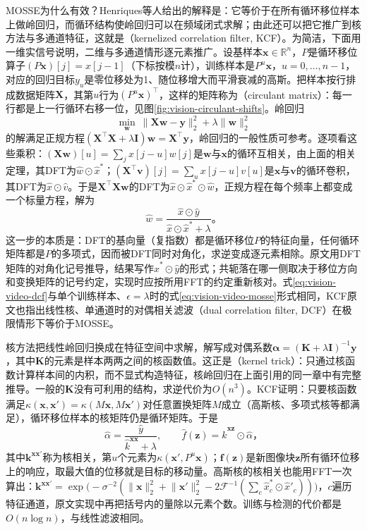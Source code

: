 MOSSE为什么有效？Henriques等人给出的解释是：它等价于在所有循环移位样本上做岭回归，而循环结构使岭回归可以在频域闭式求解；由此还可以把它推广到核方法与多通道特征，这就是（kernelized correlation filter, KCF）。为简洁，下面用一维实信号说明，二维与多通道情形逐元素推广。设基样本$\bm{x}\in\mathbb{R}^n$，$P$是循环移位算子$(P\bm{x})[j]=x[j-1]$（下标按模$n$计），训练样本是$P^u\bm{x}$，$u=0,\ldots,n-1$，对应的回归目标$y_u$是零位移处为1、随位移增大而平滑衰减的高斯。把样本按行排成数据矩阵$\bm{X}$，其第$u$行为$(P^u\bm{x})^\top$，这样的矩阵称为（circulant matrix）：每一行都是上一行循环右移一位，见图\ref{fig:vision-circulant-shifts}。岭回归
\[
  \min_{\bm{w}}\ \lVert\bm{X}\bm{w}-\bm{y}\rVert_2^2+\lambda\lVert\bm{w}\rVert_2^2
\]
的解满足正规方程$(\bm{X}^\top\bm{X}+\lambda\bm{I})\bm{w}=\bm{X}^\top\bm{y}$，岭回归的一般性质可参考。逐项看这些乘积：$(\bm{X}\bm{w})[u]=\sum_jx[j-u]w[j]$是$\bm{w}$与$\bm{x}$的循环互相关，由上面的相关定理，其DFT为$\widehat{w}\odot\widehat{x}^*$；$(\bm{X}^\top\bm{v})[j]=\sum_ux[j-u]v[u]$是$\bm{x}$与$\bm{v}$的循环卷积，其DFT为$\widehat{x}\odot\widehat{v}$。于是$\bm{X}^\top\bm{X}\bm{w}$的DFT为$\widehat{x}\odot\widehat{x}^*\odot\widehat{w}$，正规方程在每个频率上都变成一个标量方程，解为
\begin{equation}
  \widehat{w}=\frac{\widehat{x}\odot\widehat{y}}{\widehat{x}\odot\widehat{x}^*+\lambda}\text{。}
  \label{eq:vision-video-dcf}
\end{equation}
这一步的本质是：DFT的基向量（复指数）都是循环移位$P$的特征向量，任何循环矩阵都是$P$的多项式，因而被DFT同时对角化，求逆变成逐元素相除。原文用DFT矩阵的对角化记号推导，结果写作$\widehat{x}^*\odot\widehat{y}$的形式；共轭落在哪一侧取决于移位方向和变换矩阵的记号约定，实现时应按所用FFT的约定重新核对。式\eqref{eq:vision-video-dcf}与单个训练样本、$\epsilon=\lambda$时的式\eqref{eq:vision-video-mosse}形式相同，KCF原文也指出线性核、单通道时的对偶相关滤波（dual correlation filter, DCF）在极限情形下等价于MOSSE。

核方法把线性岭回归换成在特征空间中求解，解写成对偶系数$\bm{\alpha}=(\bm{K}+\lambda\bm{I})^{-1}\bm{y}$，其中$\bm{K}$的元素是样本两两之间的核函数值。这正是（kernel trick）：只通过核函数计算样本间的内积，而不显式构造特征，核岭回归在上面引用的同一章中有完整推导。一般的$\bm{K}$没有可利用的结构，求逆代价为$O(n^3)$。KCF证明：只要核函数满足$\kappa(\bm{x},\bm{x}')=\kappa(M\bm{x},M\bm{x}')$对任意置换矩阵$M$成立（高斯核、多项式核等都满足），循环移位样本的核矩阵仍是循环矩阵。于是
\[
  \widehat{\alpha}=\frac{\widehat{y}}{\widehat{k}^{\bm{xx}}+\lambda},\qquad
  \widehat{f}(\bm{z})=\widehat{k}^{\bm{xz}}\odot\widehat{\alpha}\text{，}
\]
其中$\bm{k}^{\bm{xx}'}$称为核相关，第$u$个元素为$\kappa(\bm{x}',P^u\bm{x})$；$\bm{f}(\bm{z})$是新图像块$\bm{z}$所有循环位移上的响应，取最大值的位移就是目标的移动量。高斯核的核相关也能用FFT一次算出：$\bm{k}^{\bm{xx}'}=\exp\bigl(-\sigma^{-2}(\lVert\bm{x}\rVert_2^2+\lVert\bm{x}'\rVert_2^2-2\mathcal{F}^{-1}(\sum_c\widehat{x}_c^*\odot\widehat{x}'_c))\bigr)$，$c$遍历特征通道，原文实现中再把括号内的量除以元素个数。训练与检测的代价都是$O(n\log n)$，与线性滤波相同。

